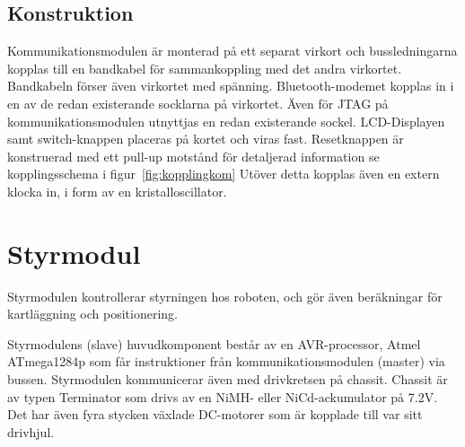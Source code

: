 \documentclass[a4paper,12pt,fleqn]{article}
\begin{document}
\subsection{Konstruktion}
Kommunikationsmodulen är monterad på ett separat virkort och bussledningarna kopplas till en bandkabel för sammankoppling med det andra virkortet.  Bandkabeln förser även virkortet med spänning.
Bluetooth-modemet kopplas in i en av de redan existerande socklarna på virkortet. Även för JTAG på kommunikationsmodulen utnyttjas en redan existerande sockel. LCD-Displayen samt switch-knappen placeras på kortet och viras fast. Resetknappen är konstruerad med ett pull-up motstånd för detaljerad information se kopplingsschema i figur~\ref{fig:kopplingkom}
Utöver detta kopplas även en extern klocka in, i form av en kristalloscillator.


\newpage
\section{Styrmodul}
Styrmodulen kontrollerar styrningen hos roboten, och gör även beräkningar för kartläggning och positionering. 

Styrmodulens (slave) huvudkomponent består av en AVR-processor, Atmel ATmega1284p som får instruktioner från kommunikationsmodulen (master) via bussen. Styrmodulen kommunicerar även med drivkretsen på chassit. Chassit är av typen Terminator som drivs av en NiMH- eller NiCd-ackumulator på 7.2V. Det har även fyra stycken växlade DC-motorer som är kopplade till var sitt drivhjul. 
\end{document}
